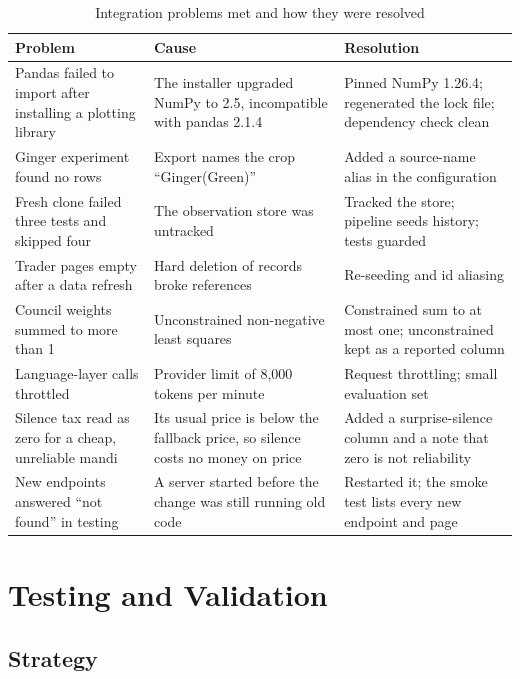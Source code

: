 \begin{table}[H]
\centering
\caption{Integration problems met and how they were resolved}
\label{tab:challenges}
\small
\begin{tabular}{|p{4.6cm}|p{5.2cm}|p{4.6cm}|}
\hline
\textbf{Problem} & \textbf{Cause} & \textbf{Resolution} \\ \hline
Pandas failed to import after installing a plotting library & The installer upgraded NumPy to 2.5, incompatible with pandas 2.1.4 & Pinned NumPy 1.26.4; regenerated the lock file; dependency check clean \\ \hline
Ginger experiment found no rows & Export names the crop ``Ginger(Green)'' & Added a source-name alias in the configuration \\ \hline
Fresh clone failed three tests and skipped four & The observation store was untracked & Tracked the store; pipeline seeds history; tests guarded \\ \hline
Trader pages empty after a data refresh & Hard deletion of records broke references & Re-seeding and id aliasing \\ \hline
Council weights summed to more than 1 & Unconstrained non-negative least squares & Constrained sum to at most one; unconstrained kept as a reported column \\ \hline
Language-layer calls throttled & Provider limit of 8,000 tokens per minute & Request throttling; small evaluation set \\ \hline
Silence tax read as zero for a cheap, unreliable mandi & Its usual price is below the fallback price, so silence costs no money on price & Added a surprise-silence column and a note that zero is not reliability \\ \hline
New endpoints answered ``not found'' in testing & A server started before the change was still running old code & Restarted it; the smoke test lists every new endpoint and page \\ \hline
\end{tabular}
\end{table}



\section{Testing and Validation}
\label{sec:testing-validation}

\subsection{Strategy}

